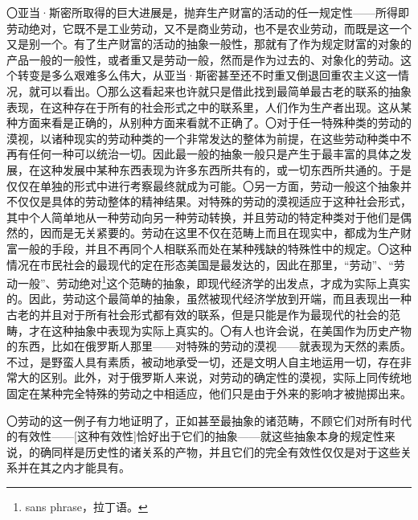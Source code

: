 \documentclass[a4paper,twoside,12pt]{ctexart}
\begin{document}
〇亚当·斯密所取得的巨大进展是，抛弃生产财富的活动的任一规定性——所得即劳动绝对，它既不是工业劳动，又不是商业劳动，也不是农业劳动，而既是这一个又是别一个。有了生产财富的活动的抽象一般性，那就有了作为规定财富的对象的产品一般的一般性，或者重又是劳动一般，然而是作为过去的、对象化的劳动。这个转变是多么艰难多么伟大，从亚当·斯密甚至还不时重又倒退回重农主义这一情况，就可以看出。〇那么这看起来也许就只是借此找到最简单最古老的联系的抽象表现，在这种存在于所有的社会形式之中的联系里，人们作为生产者出现。这从某种方面来看是正确的，从别种方面来看就不正确了。〇对于任一特殊种类的劳动的漠视，以诸种现实的劳动种类的一个非常发达的整体为前提，在这些劳动种类中不再有任何一种可以统治一切。因此最一般的抽象一般只是产生于最丰富的具体之发展，在这种发展中某种东西表现为许多东西所共有的，或一切东西所共通的。于是仅仅在单独的形式中进行考察最终就成为可能。〇另一方面，劳动一般这个抽象并不仅仅是具体的劳动整体的精神结果。对特殊的劳动的漠视适应于这种社会形式，其中个人简单地从一种劳动向另一种劳动转换，并且劳动的特定种类对于他们是偶然的，因而是无关紧要的。劳动在这里不仅在范畴上而且在现实中，都成为生产财富一般的手段，并且不再同个人相联系而处在某种残缺的特殊性中的规定。〇这种情况在市民社会的最现代的定在形态美国是最发达的，因此在那里，“劳动”、“劳动一般”、劳动绝对\footnote{sans phrase，拉丁语。}这个范畴的抽象，即现代经济学的出发点，才成为实际上真实的。因此，劳动这个最简单的抽象，虽然被现代经济学放到开端，而且表现出一种古老的并且对于所有社会形式都有效的联系，但是只能是作为最现代的社会的范畴，才在这种抽象中表现为实际上真实的。〇有人也许会说，在美国作为历史产物的东西，比如在俄罗斯人那里——对特殊的劳动的漠视——就表现为天然的素质。不过，是野蛮人具有素质，被动地承受一切，还是文明人自主地运用一切，存在非常大的区别。此外，对于俄罗斯人来说，对劳动的确定性的漠视，实际上同传统地固定在某种完全特殊的劳动之中相适应，他们只是由于外来的影响才被抛掷出来。

〇劳动的这一例子有力地证明了，正如甚至最抽象的诸范畴，不顾它们对所有时代的有效性——[这种有效性]恰好出于它们的抽象——就这些抽象本身的规定性来说，的确同样是历史性的诸关系的产物，并且它们的完全有效性仅仅是对于这些关系并在其之内才能具有。
\end{document}
